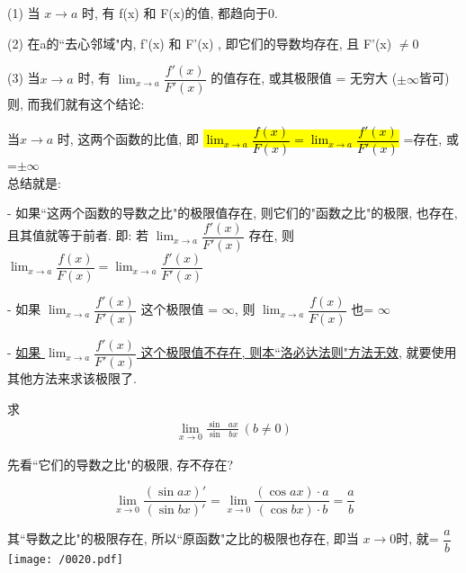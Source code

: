 \documentclass[UTF8]{ctexart}
\begin{document}
(1) 当 $x \to a$ 时, 有 f(x) 和 F(x)的值, 都趋向于0.

(2) 在a的``去心邻域"内,  f'(x) 和 F'(x) , 即它们的导数均存在, 且 F'(x) $\ne 0$

(3) 当$x \to a$ 时, 有 $\lim_{x \to a} \dfrac{f'(x)} {F'(x)}$ 的值存在, 或其极限值 = 无穷大 ($\pm \infty$皆可) \\

则, 而我们就有这个结论:

当$x \to a$ 时, 这两个函数的比值, 即 \hl{$\lim_{x \to a} \dfrac{f(x)} {F(x)} = \lim_{x \to a} \dfrac{f'(x)} {F'(x)}$} =存在, 或=$\pm \infty$ \\

总结就是:

- 如果``这两个函数的导数之比"的极限值存在, 则它们的"函数之比"的极限, 也存在, 且其值就等于前者.  即: 若 $\lim_{x \to a} \dfrac{f'(x)} {F'(x)} $ 存在, 则  $\lim_{x \to a} \dfrac{f(x)} {F(x)} = \lim_{x \to a} \dfrac{f'(x)} {F'(x)}$

- 如果 $\lim_{x \to a} \dfrac{f'(x)} {F'(x)} $ 这个极限值 = $\infty$, 则   $\lim_{x \to a} \dfrac{f(x)} {F(x)} $ 也= $\infty$

- \underline{如果 $\lim_{x \to a} \dfrac{f'(x)} {F'(x)} $ 这个极限值不存在, 则本``洛必达法则"方法无效}, 就要使用其他方法来求该极限了.


\begin{tcolorbox}[title = {例},boxrule={0.1em},colframe={black!10}, colback={black!3},colbacktitle={black!10},coltitle={black}]
	求 \begin{align*}  %
		\lim_{x\rightarrow 0}\frac{\sin\text{\ }ax}{\sin\text{\ }bx}\ \left( b\ne 0 \right) 
	\end{align*}
	
	先看``它们的导数之比"的极限, 存不存在?
	
	$$
	\lim_{x\rightarrow 0}\frac{\left( \sin ax \right) '}{\left( \sin bx \right) '}=\lim_{x\rightarrow 0}\frac{\left( \cos ax \right) \cdot a}{\left( \cos bx \right) \cdot b}=\frac{a}{b}
	$$
	
	其``导数之比"的极限存在, 所以``原函数"之比的极限也存在, 即当 $x \to 0$时, 就= $\dfrac{a}{b}$ \\
	
	\texttt{[image: /0020.pdf]}
\end{tcolorbox}
\end{document}
